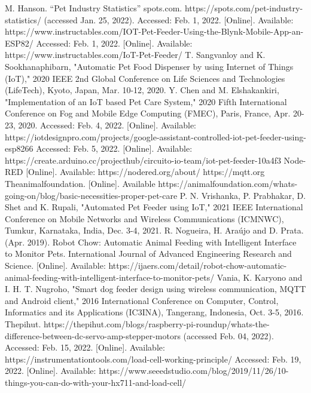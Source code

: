 \documentclass[conference]{IEEEtran}
\begin{document}
\begin{thebibliography}{00}
M.  Hanson.  “Pet  Industry  Statistics”  spots.com.  https://spots.com/pet-industry-statistics/ (accessed Jan. 25, 2022). 
Accessed: Feb. 1, 2022. [Online]. Available: https://www.instructables.com/IOT-Pet-Feeder-Using-the-Blynk-Mobile-App-an-ESP82/
Accessed: Feb. 1, 2022. [Online]. Available: https://www.instructables.com/IoT-Pet-Feeder/
T. Sangvanloy and K. Sookhanaphibarn, "Automatic Pet Food Dispenser by using Internet of Things (IoT)," 2020 IEEE 2nd Global Conference on Life Sciences and Technologies (LifeTech), Kyoto, Japan, Mar. 10-12, 2020.
Y. Chen and M. Elshakankiri, "Implementation of an IoT based Pet Care System," 2020 Fifth International Conference on Fog and Mobile Edge Computing (FMEC), Paris, France, Apr. 20-23, 2020.
Accessed: Feb. 4, 2022. [Online]. Available: https://iotdesignpro.com/projects/google-assistant-controlled-iot-pet-feeder-using-esp8266
Accessed: Feb. 5, 2022. [Online]. Available: https://create.arduino.cc/projecthub/circuito-io-team/iot-pet-feeder-10a4f3
Node-RED [Online]. Available: https://nodered.org/about/
 https://mqtt.org
Theanimalfoundation. [Online]. Available https://animalfoundation.com/whats-going-on/blog/basic-necessities-proper-pet-care
P. N. Vrishanka, P. Prabhakar, D. Shet and K. Rupali, "Automated Pet Feeder using IoT," 2021 IEEE International Conference on Mobile Networks and Wireless Communications (ICMNWC), Tumkur, Karnataka, India, Dec. 3-4, 2021.
R. Nogueira, H. Araújo and D. Prata. (Apr. 2019). Robot Chow: Automatic Animal Feeding with Intelligent Interface to Monitor Pets. International Journal of Advanced Engineering Research and Science. [Online]. Available: https://ijaers.com/detail/robot-chow-automatic-animal-feeding-with-intelligent-interface-to-monitor-pets/
Vania, K. Karyono and I. H. T. Nugroho, "Smart dog feeder design using wireless communication, MQTT and Android client," 2016 International Conference on Computer, Control, Informatics and its Applications (IC3INA), Tangerang, Indonesia, Oct. 3-5, 2016.
Thepihut. https://thepihut.com/blogs/raspberry-pi-roundup/whats-the-difference-between-dc-servo-amp-stepper-motors (accessed Feb. 04, 2022).
Accessed: Feb. 15, 2022. [Online]. Available: https://instrumentationtools.com/load-cell-working-principle/
Accessed: Feb. 19, 2022. [Online]. Available: https://www.seeedstudio.com/blog/2019/11/26/10-things-you-can-do-with-your-hx711-and-load-cell/

\end{thebibliography}
\end{document}
